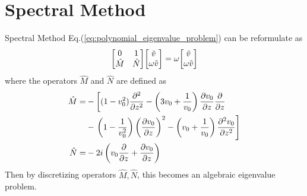 \section{Spectral Method}
\begin{frame}{Spectral Method}
  Eq.(\ref{eq:polynomial_eigenvalue_problem}) can be reformulate as 
  \begin{equation} \label{eq:eigenvalue-problem}
	\mqty[ 0 & 1\\ \hat{M} & \hat{N} ]\mqty[ \tilde{v}\\ \omega \tilde{v}] = \omega\mqty[ \tilde{v}\\ \omega \tilde{v}]
\end{equation}
where the operators $\hat{M}$ and $\hat{N}$ are defined as
\begin{align*}
	\hat{M} = &-\left[(1-v_0^2)\pdv[2]{}{z} 
	-\left(3v_0 + \frac{1}{v_0}\right)\pdv{v_0}{z}\pdv{}{z}\right. \\ 
  &- \left.  \left(1-\frac{1}{v_0^2}\right)\left(\pdv{v_0}{z}\right)^2 
	- \left(v_0+\frac{1}{v_0}\right)\pdv[2]{v_0}{z}\right] \\
	\hat{N} = &-2i\left(v_0\pdv{}{z} +\pdv{v_0}{z} \right) 
\end{align*}
  Then by discretizing operators $\hat{M},\hat{N}$, this becomes an algebraic eigenvalue problem.
\end{frame}


